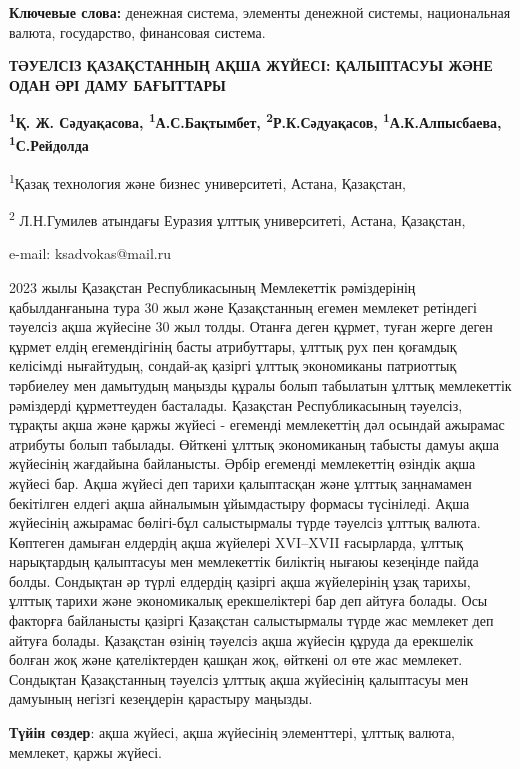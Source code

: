 {\bfseries Ключевые слова:} денежная система, элементы денежной системы,
национальная валюта, государство, финансовая система.

\begin{center}
{\large\bfseries ТӘУЕЛСІЗ ҚАЗАҚСТАННЫҢ АҚША ЖҮЙЕСІ: ҚАЛЫПТАСУЫ ЖӘНЕ ОДАН ӘРІ ДАМУ БАҒЫТТАРЫ}

{\bfseries \textsuperscript{1}Қ. Ж. Сәдуақасова\envelope, \textsuperscript{1}А.С.Бақтымбет, \textsuperscript{2}Р.К.Сәдуақасов, \textsuperscript{1}А.К.Алпысбаева, \textsuperscript{1}С.Рейдолда}

\textsuperscript{1}Қазақ технология және бизнес университеті, Астана,
Қазақстан,

\textsuperscript{2} Л.Н.Гумилев атындағы Еуразия ұлттық университеті,
Астана, Қазақстан,

e-mail: ksadvokas@mail.ru
\end{center}

2023 жылы Қазақстан Республикасының Мемлекеттік рәміздерінің
қабылданғанына тура 30 жыл және Қазақстанның егемен мемлекет ретіндегі
тәуелсіз ақша жүйесіне 30 жыл толды. Отанға деген құрмет, туған жерге
деген құрмет елдің егемендігінің басты атрибуттары, ұлттық рух пен
қоғамдық келісімді нығайтудың, сондай-ақ қазіргі ұлттық экономиканы
патриоттық тәрбиелеу мен дамытудың маңызды құралы болып табылатын ұлттық
мемлекеттік рәміздерді құрметтеуден басталады. Қазақстан Республикасының
тәуелсіз, тұрақты ақша және қаржы жүйесі - егеменді мемлекеттің дәл
осындай ажырамас атрибуты болып табылады. Өйткені ұлттық экономиканың
табысты дамуы ақша жүйесінің жағдайына байланысты. Әрбір егеменді
мемлекеттің өзіндік ақша жүйесі бар. Ақша жүйесі деп тарихи қалыптасқан
және ұлттық заңнамамен бекітілген елдегі ақша айналымын ұйымдастыру
формасы түсініледі. Ақша жүйесінің ажырамас бөлігі-бұл салыстырмалы
түрде тәуелсіз ұлттық валюта. Көптеген дамыған елдердің ақша жүйелері
XVI--XVII ғасырларда, ұлттық нарықтардың қалыптасуы мен мемлекеттік
биліктің нығаюы кезеңінде пайда болды. Сондықтан әр түрлі елдердің
қазіргі ақша жүйелерінің ұзақ тарихы, ұлттық тарихи және экономикалық
ерекшеліктері бар деп айтуға болады. Осы факторға байланысты қазіргі
Қазақстан салыстырмалы түрде жас мемлекет деп айтуға болады. Қазақстан
өзінің тәуелсіз ақша жүйесін құруда да ерекшелік болған жоқ және
қателіктерден қашқан жоқ, өйткені ол өте жас мемлекет. Сондықтан
Қазақстанның тәуелсіз ұлттық ақша жүйесінің қалыптасуы мен дамуының
негізгі кезеңдерін қарастыру маңызды.

{\bfseries Түйін сөздер}: ақша жүйесі, ақша жүйесінің элементтері, ұлттық
валюта, мемлекет, қаржы жүйесі.


